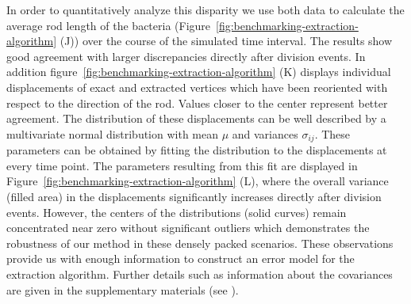 In order to quantitatively analyze this disparity we use both data to calculate the average rod
length of the bacteria (Figure~\ref{fig:benchmarking-extraction-algorithm} (J)) over
the course of
the simulated time interval.
The results show good agreement with larger discrepancies directly after division events.
In addition figure~\ref{fig:benchmarking-extraction-algorithm} (K) displays
individual displacements
of exact and extracted vertices which have been reoriented with respect to the
direction of the rod.
Values closer to the center represent better agreement.
The distribution of these displacements can be well described by a multivariate normal
distribution with mean $\mu$ and variances $\sigma_{ij}$.
These parameters can be obtained by fitting the distribution to the displacements at every time
point.
The parameters resulting from this fit are displayed in
Figure~\ref{fig:benchmarking-extraction-algorithm} (L), where the overall variance
(filled area) in
the displacements significantly increases directly after division events.
However, the centers of the distributions (solid curves) remain concentrated near zero without
significant outliers which demonstrates the robustness of our method in these densely packed
scenarios.
These observations provide us with enough information to construct an error model for
the extraction
algorithm.
Further details such as information about the covariances are given in the
supplementary materials
(see ).

